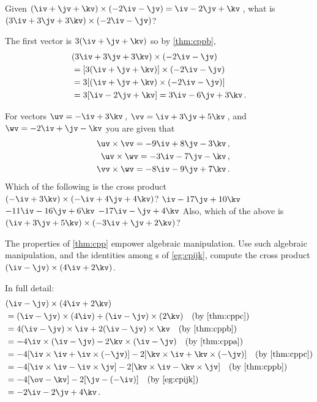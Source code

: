 \begin{example} 
Given \((\iv+\jv+\kv)\times(-2\iv-\jv)=\iv-2\jv+\kv\)\,, what is \((3\iv+3\jv+3\kv)\times(-2\iv-\jv)\)?
\begin{solution} 
The first vector is \(3(\iv+\jv+\kv)\) so by \cref{thm:cppb},
\begin{align*}
&(3\iv+3\jv+3\kv)\times(-2\iv-\jv)
\\&=[3(\iv+\jv+\kv)]\times(-2\iv-\jv)
\\&=3[(\iv+\jv+\kv)\times(-2\iv-\jv)]
\\&=3[\iv-2\jv+\kv]=3\iv-6\jv+3\kv\,.
\end{align*}
\end{solution}
\end{example}


\begin{activity}  
For vectors \(\uv=-\iv+3\kv\)\,, \(\vv=\iv+3\jv+5\kv\)\,, and \(\wv=-2\iv+\jv-\kv\) you are given that 
\begin{eqnarray*}
&&\uv\times\vv=-9\iv+8\jv-3\kv\,,
\\&&\uv\times\wv=-3\iv-7\jv-\kv\,,
\\&&\vv\times\wv=-8\iv-9\jv+7\kv\,.
\end{eqnarray*}
Which of the following is the cross product \((-\iv+3\kv)\times(-\iv+4\jv+4\kv)\)?
\actposs{\(-12\iv+\jv-4\kv\)}
{\(\iv-17\jv+10\kv\)}
{\(-11\iv-16\jv+6\kv\)}
{\(-17\iv-\jv+4\kv\)}
Also, which of the above is \((\iv+3\jv+5\kv)\times(-3\iv+\jv+2\kv)\)? %
\end{activity}




\begin{example} 
The properties of \cref{thm:cpp} empower algebraic manipulation.
Use such algebraic manipulation, and the identities among s of \cref{eg:cpijk}, compute the cross product \((\iv-\jv)\times(4\iv+2\kv)\).
\begin{solution} In full detail:
\begin{align*}
&(\iv-\jv)\times(4\iv+2\kv)
\\&=(\iv-\jv)\times(4\iv)+(\iv-\jv)\times(2\kv) 
\quad(\text{by \ref{thm:cppc}})
\\&=4(\iv-\jv)\times\iv+2(\iv-\jv)\times\kv
\quad(\text{by \ref{thm:cppb}})
\\&=-4\iv\times(\iv-\jv)-2\kv\times(\iv-\jv)
\quad(\text{by \ref{thm:cppa}})
\\&=-4[\iv\times\iv+\iv\times(-\jv)]-2[\kv\times\iv+\kv\times(-\jv)]
\quad(\text{by \ref{thm:cppc}})
\\&=-4[\iv\times\iv-\iv\times\jv]-2[\kv\times\iv-\kv\times\jv]
\quad(\text{by \ref{thm:cppb}})
\\&=-4[\ov-\kv]-2[\jv-(-\iv)]
\quad(\text{by \cref{eg:cpijk}})
\\&=-2\iv-2\jv+4\kv\,.
\end{align*}
\end{solution}
\end{example}







